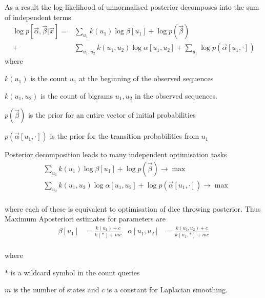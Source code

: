 \documentclass[landscape,footrule]{foils}
\begin{document}

\enlargethispage{0.5cm}
As a result the log-likelihood of unnormalised posterior decomposes into the sum of independent terms
\begin{align*}
\log p[\vec{\alpha},\vec{\beta}|\vec{x}]
=&\sum_{u_1} k(u_1)\log \beta[u_1] + \log p(\vec{\beta})\\
+&\sum_{u_1,u_2} k(u_1,u_2)\log\alpha[u_1,u_2]+\sum_{u_1}\log p(\vec{\alpha}[u_1,\cdot]) 
\end{align*}
where 
\begin{triangles}
\item $k(u_1)$ is the count $u_1$ at the beginning of the observed sequences
\item $k(u_1,u_2)$ is the count of bigrams $u_1, u_2$ in the observed sequences.
\item $p(\vec{\beta})$ is the prior for an entire vector of initial probabilities
\item $p(\vec{\alpha}[u_1,\cdot])$ is the prior for the transition probabilities from $u_1$ 
\end{triangles}

\enlargethispage{4cm}
Posterior decomposition leads to many independent optimisation tasks\vspace*{-2ex}
\begin{align*}
&\sum_{u_1} k(u_1)\log \beta[u_1] + \log p(\vec{\beta})\to\max\\
&\sum_{u_2} k(u_1,u_2)\log\alpha[u_1,u_2]+\log p(\vec{\alpha}[u_1,\cdot])\to\max 
\end{align*}\vspace*{-4ex} \ \\
where each of these is equivalent to optimisation of dice throwing posterior. 
Thus Maximum Aposteriori estimates for parameters are \vspace*{-2ex}
\begin{align*}
\beta[u_1]&=\frac{k(u_1)+c}{k(*)+mc} &
\alpha[u_1,u_2]&=\frac{k(u_1,u_2)+c}{k(u_1,*)+mc}
\end{align*}\vspace*{-4ex}\ \\
where
\begin{triangles}
\item $*$ is a wildcard symbol in the count queries
\item $m$ is the number of  states and $c$ is a constant for Laplacian smoothing. 
\end{triangles}
 
\end{document}
